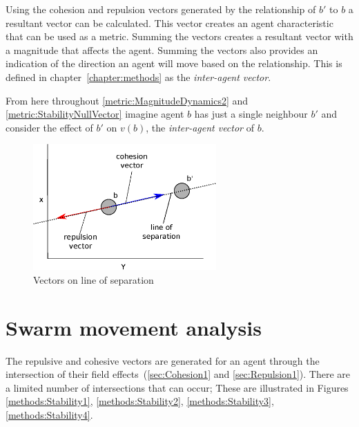 Using the cohesion and repulsion vectors generated by the relationship of $b'$ to $b$ a resultant vector can be calculated. This vector creates an agent characteristic that can be used as a metric. Summing the vectors creates a resultant vector with a magnitude that affects the agent. Summing the vectors also provides an indication of the direction an agent will move based on the relationship. This is defined in chapter~\ref{chapter:methods} as the \textit{inter-agent vector}.

From here throughout \autoref{metric:MagnitudeDynamics2} and \autoref{metric:StabilityNullVector} imagine agent $b$ has just a single neighbour $b'$ and consider the effect of $b'$ on $v(b)$, the \textit{inter-agent vector} of $b$.

\begin{figure}[H]
\begin{center}
\includegraphics[width=7cm]{CHAPTER-4/figures/Stability5}
\end{center}
\caption{Vectors on line of separation} \label{methods:Stability5}
\end{figure}

\section{Swarm movement analysis\label{metric:MagnitudeDynamics2}}
The repulsive and cohesive vectors are generated for an agent through the intersection of their field effects~(\autoref{sec:Cohesion1} and \autoref{sec:Repulsion1}). There are a limited number of intersections that can occur; These are illustrated in Figures \ref{methods:Stability1}, \ref{methods:Stability2}, \ref{methods:Stability3}, \ref{methods:Stability4}.

